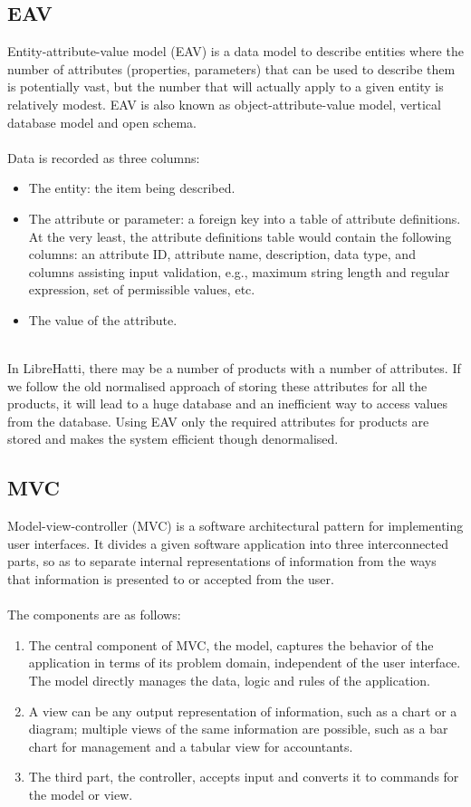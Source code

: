\documentclass[12pt]{article}
\begin{document}
\begin{enumerate}
\subsection{EAV}
Entity-attribute-value model (EAV) is a data model to describe entities where the number of attributes (properties, parameters) that can be used to describe them is potentially vast, but the number that will actually apply to a given entity is relatively modest. EAV is also known as object-attribute-value model, vertical database model and open schema.\\ \\
Data is recorded as three columns:
\begin{itemize}
\item The entity: the item being described.
\item  The attribute or parameter: a foreign key into a table of attribute definitions. At the
very least, the attribute definitions table would contain the following columns: an attribute
ID, attribute name, description, data type, and columns assisting input validation, e.g.,
maximum string length and regular expression, set of permissible values, etc.
\item  The value of the attribute.
\end{itemize}\\ 
In LibreHatti, there may be a number of products with a number of attributes. If we follow
the old normalised approach of storing these attributes for all the products, it will lead to a huge
database and an inefficient way to access values from the database. Using EAV only the required
attributes for products are stored and makes the system efficient though denormalised.

\subsection{MVC}
Model-view-controller (MVC) is a software architectural pattern for implementing user interfaces.
It divides a given software application into three interconnected parts, so as to separate internal
representations of information from the ways that information is presented to or accepted from
the user.\\ \\
The components are as follows:\\
\begin{enumerate}
\item The central component of MVC, the model, captures the behavior of the application in terms
of its problem domain, independent of the user interface. The model directly manages the
data, logic and rules of the application.
\item  A view can be any output representation of information, such as a chart or a diagram;
multiple views of the same information are possible, such as a bar chart for management and
a tabular view for accountants.
\item  The third part, the controller, accepts input and converts it to commands for the model or
view.
\end{enumerate}

\end{enumerate}
\end{document}
